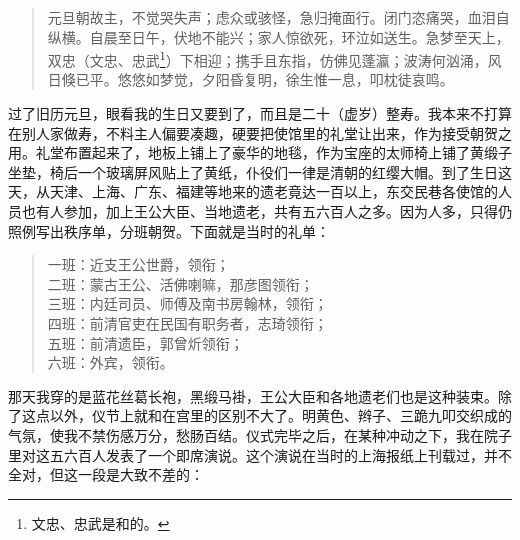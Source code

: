 \begin{quote}
	元旦朝故主，不觉哭失声；虑众或骇怪，急归掩面行。闭门恣痛哭，血泪自纵横。自晨至日午，伏地不能兴；家人惊欲死，环泣如送生。急梦至天上，双忠（文忠、忠武\footnote{文忠、忠武是和的。}）下相迎；携手且东指，仿佛见蓬瀛；波涛何汹涌，风日倏已平。悠悠如梦觉，夕阳昏复明，徐生惟一息，叩枕徒哀鸣。\\
\end{quote}

过了旧历元旦，眼看我的生日又要到了，而且是二十（虚岁）整寿。我本来不打算在别人家做寿，不料主人偏要凑趣，硬要把使馆里的礼堂让出来，作为接受朝贺之用。礼堂布置起来了，地板上铺上了豪华的地毯，作为宝座的太师椅上铺了黄缎子坐垫，椅后一个玻璃屏风贴上了黄纸，仆役们一律是清朝的红缨大帽。到了生日这天，从天津、上海、广东、福建等地来的遗老竟达一百以上，东交民巷各使馆的人员也有人参加，加上王公大臣、当地遗老，共有五六百人之多。因为人多，只得仍照例写出秩序单，分班朝贺。下面就是当时的礼单：\\

\begin{quote}
	一班：近支王公世爵，领衔；\\

二班：蒙古王公、活佛喇嘛，那彦图领衔；\\

三班：内廷司员、师傅及南书房翰林，领衔；\\

四班：前清官吏在民国有职务者，志琦领衔；\\

五班：前清遗臣，郭曾炘领衔；\\

六班：外宾，领衔。\\
\end{quote}

那天我穿的是蓝花丝葛长袍，黑缎马褂，王公大臣和各地遗老们也是这种装束。除了这点以外，仪节上就和在宫里的区别不大了。明黄色、辫子、三跪九叩交织成的气氛，使我不禁伤感万分，愁肠百结。仪式完毕之后，在某种冲动之下，我在院子里对这五六百人发表了一个即席演说。这个演说在当时的上海报纸上刊载过，并不全对，但这一段是大致不差的：\\

